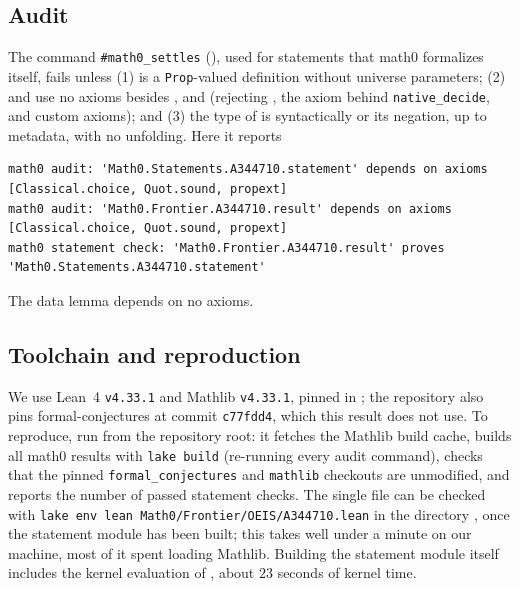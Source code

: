 \documentclass[11pt]{amsart}
\theoremstyle{plain}
\theoremstyle{definition}
\begin{document}
\subsection*{Audit}
The command \texttt{\#math0\_settles} (), used for statements that math0 formalizes itself, fails unless (1)  is a \texttt{Prop}-valued definition without universe parameters; (2)  and  use no axioms besides ,  and  (rejecting , the axiom behind \texttt{native\_decide}, and custom axioms); and (3) the type of  is syntactically  or its negation, up to metadata, with no unfolding. Here it reports
\begin{lstlisting}[basicstyle=\ttfamily\scriptsize]
math0 audit: 'Math0.Statements.A344710.statement' depends on axioms [Classical.choice, Quot.sound, propext]
math0 audit: 'Math0.Frontier.A344710.result' depends on axioms [Classical.choice, Quot.sound, propext]
math0 statement check: 'Math0.Frontier.A344710.result' proves 'Math0.Statements.A344710.statement'
\end{lstlisting}
The data lemma  depends on no axioms.

\subsection*{Toolchain and reproduction}
We use Lean~4 \cite{Lean4} \texttt{v4.33.1} and Mathlib \cite{Mathlib} \texttt{v4.33.1}, pinned in ; the repository also pins formal-conjectures \cite{FC} at commit \texttt{c77fdd4}, which this result does not use. To reproduce, run  from the repository root: it fetches the Mathlib build cache, builds all math0 results with \texttt{lake build} (re-running every audit command), checks that the pinned \texttt{formal\_conjectures} and \texttt{mathlib} checkouts are unmodified, and reports the number of passed statement checks. The single file can be checked with \texttt{lake env lean Math0/Frontier/OEIS/A344710.lean} in the directory , once the statement module has been built; this takes well under a minute on our machine, most of it spent loading Mathlib. Building the statement module itself includes the kernel evaluation of , about $23$ seconds of kernel time.
\end{document}
